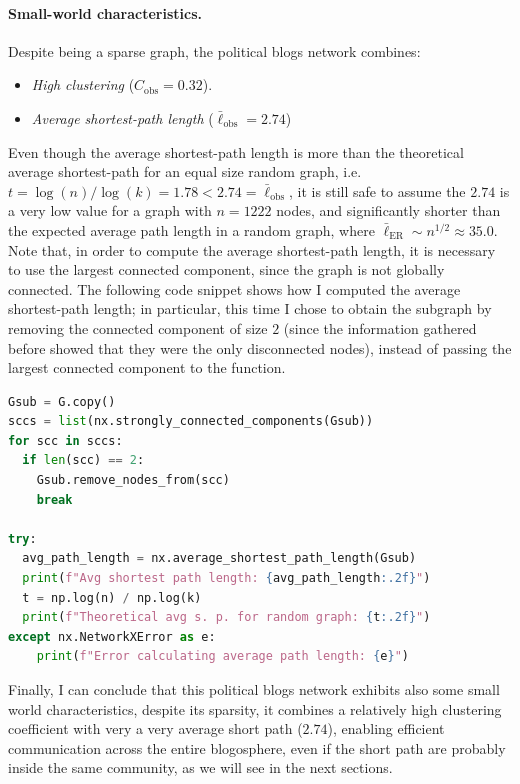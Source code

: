 \documentclass{article}
\begin{document}
\paragraph{Small-world characteristics.}
Despite being a sparse graph, the political blogs network combines:
\begin{itemize}
  \item \emph{High clustering} (\(C_{\mathrm{obs}}=0.32\)).
  \item \emph{Average shortest-path length} (\(\bar{\ell}_{\mathrm{obs}}=2.74\))
\end{itemize}

Even though the average shortest-path length is more than the theoretical average shortest-path for an equal size random graph, i.e. \ $t = \log(n)/\log(k) = 1.78 < 2.74 = \bar{\ell}_{\mathrm{obs}}$, it is still safe to assume the $2.74$ is a very low value for a graph with $n=1222$ nodes, and significantly shorter than the expected average path length in a random graph, where \(\bar{\ell}_{\mathrm{ER}} \sim n^{1/2}\approx 35.0\).
Note that, in order to compute the average shortest-path length, it is necessary to use the largest connected component, since the graph is not globally connected.
The following code snippet shows how I computed the average shortest-path length; in particular, this time I chose to obtain the subgraph by removing the connected component of size $2$ (since the information gathered before showed that they were the only disconnected nodes), instead of passing the largest connected component to the function.

\begin{lstlisting}[language=Python]
Gsub = G.copy()
sccs = list(nx.strongly_connected_components(Gsub))
for scc in sccs:
  if len(scc) == 2:
    Gsub.remove_nodes_from(scc)
    break
    
try:        
  avg_path_length = nx.average_shortest_path_length(Gsub)
  print(f"Avg shortest path length: {avg_path_length:.2f}")
  t = np.log(n) / np.log(k)
  print(f"Theoretical avg s. p. for random graph: {t:.2f}")
except nx.NetworkXError as e:
    print(f"Error calculating average path length: {e}")
\end{lstlisting}

\vspace{0.5cm}

Finally, I can conclude that this political blogs network exhibits also some small world characteristics, despite its sparsity, it combines a relatively high clustering coefficient with very a very average short path ($2.74$), enabling efficient communication across the entire blogosphere, even if the short path are probably inside the same community, as we will see in the next sections.
\end{document}
